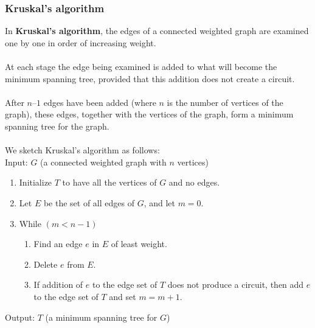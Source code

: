 \documentclass[a4paper]{article}
\begin{document}
\subsubsection{Kruskal's algorithm}
In \textbf{Kruskal’s algorithm}, the edges of a connected weighted graph are examined one by one in order of increasing weight.\\\\ 
At each stage the edge being examined is added to what will become the minimum spanning tree, provided that this addition does not create a circuit.\\\\
After $n$–$1$ edges have been added (where $n$ is the number of vertices of the graph), these edges, together with the vertices of the graph, form a minimum spanning tree for the graph.\\\\
We sketch Kruskal's algorithm as follows:\\
Input: $G$ (a connected weighted graph with $n$ vertices)
\begin{enumerate}
	\item Initialize $T$ to have all the vertices of $G$ and no edges.
	\item Let $E$ be the set of all edges of $G$, and let $m=0$.
	\item While $(m<n-1)$
	\begin{enumerate}
		\item Find an edge $e$ in $E$ of least weight.
		\item Delete $e$ from $E$.
		\item If addition of $e$ to the edge set of $T$ does not produce a circuit, then add $e$ to the edge set of $T$ and set $m=m+1$.
	\end{enumerate}
\end{enumerate}
Output: $T$ (a minimum spanning tree for $G$)
\end{document}
